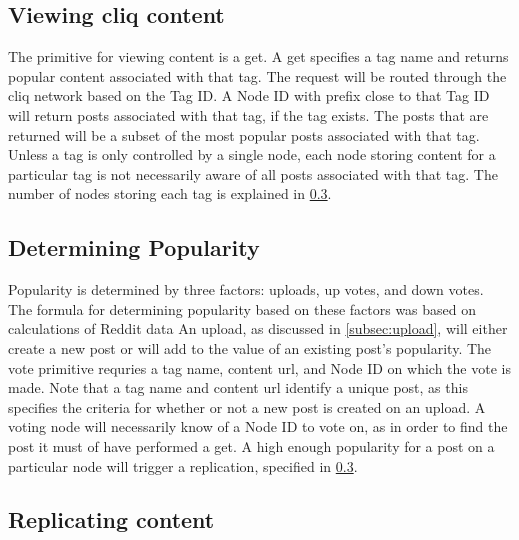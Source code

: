 \documentclass{sig-alternate}
\begin{document}
\subsection{Viewing cliq content}

The primitive for viewing content is a get. 
A get specifies a tag name and returns popular content associated with that tag. 
The request will be routed through the cliq network based on the Tag ID. 
A Node ID with prefix close to that Tag ID will return posts associated with that tag, if the tag exists. 
The posts that are returned will be a subset of the most popular posts associated with that tag. 
Unless a tag is only controlled by a single node, each node storing content for a particular tag is not necessarily aware of all posts associated with that tag. 
The number of nodes storing each tag is explained in \ref{subsec:replication}. 

\subsection{Determining Popularity}
\label{subsec:popularity}

Popularity is determined by three factors: uploads, up votes, and down votes. 
The formula for determining popularity based on these factors was
based on calculations of Reddit data
An upload, as discussed in \ref{subsec:upload}, will either create a new post or will add to the value of an existing post's popularity. 
The vote primitive requries a tag name, content url, and Node ID on which the vote is made. 
Note that a tag name and content url identify a unique post, as this specifies the criteria for whether or not a new post is created on an upload. 
A voting node will necessarily know of a Node ID to vote on, as in order to find the post it must of have performed a get. 
A high enough popularity for a post on a particular node will trigger a replication, specified in \ref{subsec:replication}. 

\subsection{Replicating content}
\label{subsec:replication}
\end{document}
